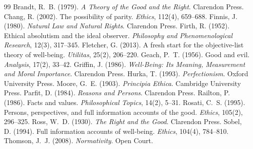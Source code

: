\documentclass{situationist-preprint}
\begin{document}
\begin{thebibliography}{99}\small
{} Brandt, R.~B. (1979). \emph{A Theory of the Good and the Right}. Clarendon Press.
 Chang, R. (2002). The possibility of parity. \emph{Ethics}, 112(4), 659--688.
 Finnis, J. (1980). \emph{Natural Law and Natural Rights}. Clarendon Press.
 Firth, R. (1952). Ethical absolutism and the ideal observer. \emph{Philosophy and Phenomenological Research}, 12(3), 317--345.
 Fletcher, G. (2013). A fresh start for the objective-list theory of well-being. \emph{Utilitas}, 25(2), 206--220.
 Geach, P.~T. (1956). Good and evil. \emph{Analysis}, 17(2), 33--42.
 Griffin, J. (1986). \emph{Well-Being: Its Meaning, Measurement and Moral Importance}. Clarendon Press.
 Hurka, T. (1993). \emph{Perfectionism}. Oxford University Press.
 Moore, G.~E. (1903). \emph{Principia Ethica}. Cambridge University Press.
 Parfit, D. (1984). \emph{Reasons and Persons}. Clarendon Press.
 Railton, P. (1986). Facts and values. \emph{Philosophical Topics}, 14(2), 5--31.
 Rosati, C.~S. (1995). Persons, perspectives, and full information accounts of the good. \emph{Ethics}, 105(2), 296--325.
 Ross, W.~D. (1930). \emph{The Right and the Good}. Clarendon Press.
 Sobel, D. (1994). Full information accounts of well-being. \emph{Ethics}, 104(4), 784--810.
 Thomson, J.~J. (2008). \emph{Normativity}. Open Court.
\end{thebibliography}
\end{document}
